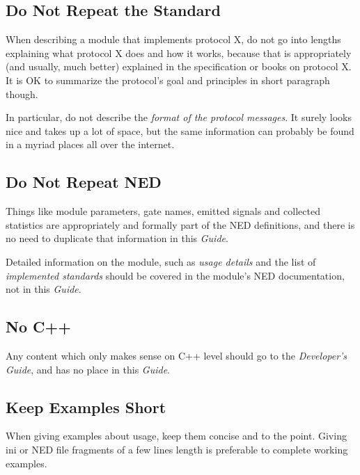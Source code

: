 \subsection{Do Not Repeat the Standard}
\label{sec:authorsguide:do-not-repeat-the-standard}

When describing a module that implements protocol X, do not go
into lengths explaining what protocol X does and how it works,
because that is appropriately (and usually, much better) explained
in the specification or books on protocol X. It is OK to summarize
the protocol's goal and principles in short paragraph though.

In particular, do not describe the \textit{format of the protocol messages}.
It surely looks nice and takes up a lot of space, but the same information
can probably be found in a myriad places all over the internet.

\subsection{Do Not Repeat NED}
\label{sec:authorsguide:do-not-repeat-ned}

Things like module parameters, gate names, emitted signals and collected
statistics are appropriately and formally part of the NED definitions,
and there is no need to duplicate that information in this \textit{Guide}.

Detailed information on the module, such as \textit{usage details} and the
list of \textit{implemented standards} should be covered in the module's
NED documentation, not in this \textit{Guide}.

\subsection{No C++}
\label{sec:authorsguide:no-cplusplus}

Any content which only makes sense on C++ level should go to the
\textit{Developer's Guide}, and has no place in this \textit{Guide}.

\subsection{Keep Examples Short}
\label{sec:authorsguide:keep-examples-short}

When giving examples about usage, keep them concise and to the point.
Giving ini or NED file fragments of a few lines length is preferable
to complete working examples.

